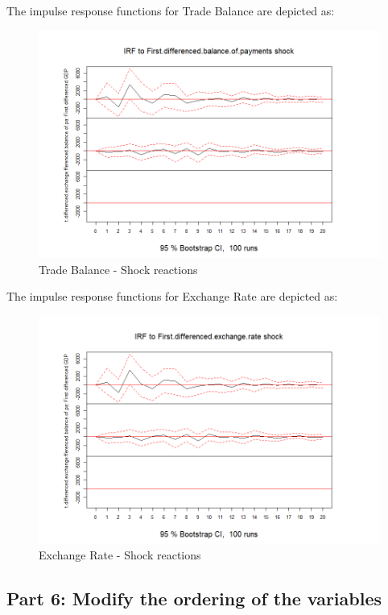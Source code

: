 \documentclass[
]{article}
\begin{document}
The impulse response functions for Trade Balance are depicted as:

\begin{figure}

{\centering \includegraphics[width=0.8\linewidth]{../results/IRF_plots/IRF_to_First.differenced.balance.of.payments} 

}

\caption{Trade Balance - Shock reactions}\label{fig:unnamed-chunk-25}
\end{figure}

The impulse response functions for Exchange Rate are depicted as:

\begin{figure}

{\centering \includegraphics[width=0.8\linewidth]{../results/IRF_plots/IRF_to_First.differenced.exchange.rate} 

}

\caption{Exchange Rate - Shock reactions}\label{fig:unnamed-chunk-26}
\end{figure}

\subsection*{Part 6: Modify the ordering of the variables}
\end{document}
